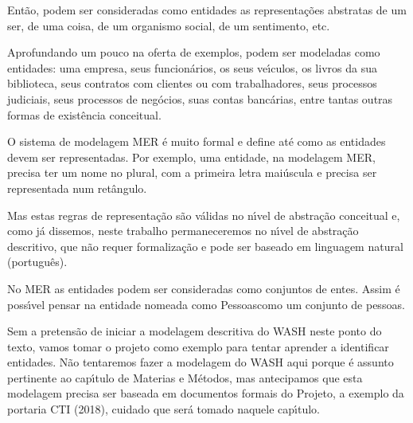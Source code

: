 \documentclass[
12pt,		%
openright,	%
twoside,  %
a4paper,			%
chapter=TITLE,		%
english,			%
french,				%
spanish,			%
brazil				%
]{USPSC-classe/USPSC_RedarTex}
\begin{document}
Ent\~ao, podem ser consideradas como entidades as representa\c{c}\~oes abstratas de um ser, de uma coisa, de um organismo social, de um sentimento, etc.










Aprofundando um pouco na oferta de exemplos, podem ser modeladas como entidades: uma empresa, seus funcion\'arios, os seus ve\'{\i}culos, os livros da sua biblioteca, seus contratos com clientes ou com trabalhadores, seus processos judiciais, seus processos de neg\'ocios, suas contas banc\'arias, entre tantas outras formas de exist\^encia conceitual.










O sistema de modelagem MER \'e muito formal e define at\'e como as entidades devem ser representadas. Por exemplo, uma entidade, na modelagem MER, precisa ter um nome no plural, com a primeira letra mai\'uscula e precisa ser representada num ret\^angulo.










Mas estas regras de representa\c{c}\~ao s\~ao v\'alidas no n\'{\i}vel de abstra\c{c}\~ao conceitual e, como j\'a dissemos, neste trabalho permaneceremos no n\'{\i}vel de abstra\c{c}\~ao descritivo, que n\~ao requer formaliza\c{c}\~ao e pode ser baseado em linguagem natural (portugu\^es).










No MER as entidades podem ser consideradas como conjuntos de entes. Assim \'e poss\'{\i}vel pensar na entidade nomeada como \textquotedbl Pessoas\textquotedbl  como um conjunto de pessoas.










Sem a pretens\~ao de iniciar a modelagem descritiva do WASH neste ponto do texto, vamos tomar o projeto como exemplo para tentar aprender a identificar entidades. N\~ao tentaremos fazer a modelagem do WASH aqui porque \'e assunto pertinente ao cap\'{\i}tulo de Materias e M\'etodos, mas antecipamos que esta modelagem precisa ser baseada em documentos formais do Projeto, a exemplo da portaria CTI (2018), cuidado que ser\'a tomado naquele cap\'{\i}tulo.
\end{document}
